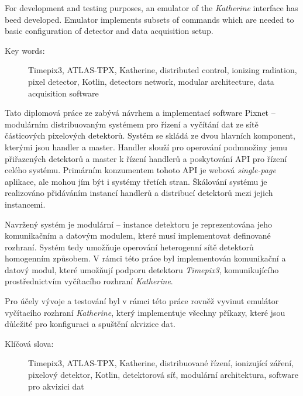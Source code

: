 \documentclass[11pt,twoside,a4paper]{book}
\begin{document}
	For development and testing purposes, an emulator of the \textit{Katherine} interface has beed developed. Emulator implements subsets of commands which are needed to basic configuration of detector and data acquisition setup.

	\vspace*{2cm}
	\begin{description}
		\item[Key words:] Timepix3, ATLAS-TPX, Katherine, distributed control, ionizing radiation, pixel detector, Kotlin, detectors network, modular architecture, data acquisition software
	\end{description}

	\abstractpagecz
	Tato diplomová práce ze zabývá návrhem a implementací software Pixnet -- modulárním distribuovaným systémem pro řízení a vyčítání dat ze sítě částicových pixelových detektorů. Systém se skládá ze dvou hlavních komponent, kterými jsou handler a master. Handler slouží pro operování podmnožiny jemu přiřazených detektorů a master k řízení handlerů a poskytování API pro řízení celého systému. Primárním konzumentem tohoto API je webová \textit{single-page} aplikace, ale mohou jím být i systémy třetích stran. Škálování systému je realizováno přidáváním instancí handlerů a distribucí detektorů mezi jejich instancemi.
	
	Navržený systém je modulární -- instance detektoru je reprezentována jeho komunikačním a datovým modulem, které musí implementovat definované rozhraní. Systém tedy umožňuje operování heterogenní sítě detektorů homogenním způsobem. V rámci této práce byl implementován komunikační a datový modul, které umožňují podporu detektoru \textit{Timepix3}, komunikujícího prostřednictvím vyčítacího rozhraní \textit{Katherine}.

	Pro účely vývoje a testování byl v rámci této práce rovněž vyvinut emulátor vyčítacího rozhraní \textit{Katherine}, který implementuje všechny příkazy, které jsou důležité pro konfiguraci a spuštění akvizice dat.

	\vspace*{2cm}
	\begin{description}
		\item[Klíčová slova:] Timepix3, ATLAS-TPX, Katherine, distribuované řízení, ionizující záření, pixelový detektor, Kotlin, detektorová síť, modulární architektura, software pro akvizici dat
	\end{description}


	\tableofcontents		%
	\listoffigures			%
	\listoftables			%
	\listofcodes			%
\end{document}

